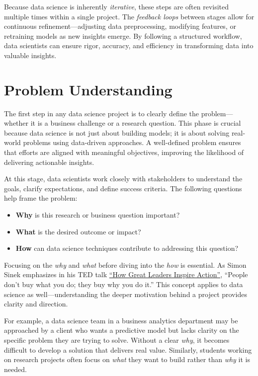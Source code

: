 \documentclass[
]{book}
\providecommand{\tightlist}{%
  \setlength{\itemsep}{0pt}\setlength{\parskip}{0pt}}
\theoremstyle{definition}
\theoremstyle{definition}
\theoremstyle{definition}
\theoremstyle{definition}
\theoremstyle{remark}
\begin{document}
Because data science is inherently \emph{iterative}, these steps are often revisited multiple times within a single project. The \emph{feedback loops} between stages allow for continuous refinement---adjusting data preprocessing, modifying features, or retraining models as new insights emerge. By following a structured workflow, data scientists can ensure rigor, accuracy, and efficiency in transforming data into valuable insights.

\section{Problem Understanding}\label{problem-understanding}

The first step in any data science project is to clearly define the problem---whether it is a business challenge or a research question. This phase is crucial because data science is not just about building models; it is about solving real-world problems using data-driven approaches. A well-defined problem ensures that efforts are aligned with meaningful objectives, improving the likelihood of delivering actionable insights.

At this stage, data scientists work closely with stakeholders to understand the goals, clarify expectations, and define success criteria. The following questions help frame the problem:

\begin{itemize}
\tightlist
\item
  \textbf{Why} is this research or business question important?\\
\item
  \textbf{What} is the desired outcome or impact?\\
\item
  \textbf{How} can data science techniques contribute to addressing this question?
\end{itemize}

Focusing on the \emph{why} and \emph{what} before diving into the \emph{how} is essential. As Simon Sinek emphasizes in his TED talk \href{https://www.ted.com/talks/simon_sinek_how_great_leaders_inspire_action?utm_campaign=tedspread&utm_medium=referral&utm_source=tedcomshare}{``How Great Leaders Inspire Action''}, ``People don't buy what you do; they buy why you do it.'' This concept applies to data science as well---understanding the deeper motivation behind a project provides clarity and direction.

For example, a data science team in a business analytics department may be approached by a client who wants a predictive model but lacks clarity on the specific problem they are trying to solve. Without a clear \emph{why}, it becomes difficult to develop a solution that delivers real value. Similarly, students working on research projects often focus on \emph{what} they want to build rather than \emph{why} it is needed.
\end{document}
